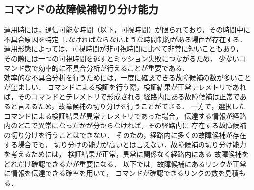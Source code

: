 \documentclass[11pt]{jsreport}
\begin{document}
\subsection{コマンドの故障候補切り分け能力}
運用時には，通信可能な時間（以下，可視時間）が限られており，その時間中に不具合原因を特定
しなければならないような時間制約がある場面が存在する．
運用形態によっては，可視時間が非可視時間に比べて非常に短いこともあり，
その際には一つの可視時間を逃すとミッション失敗につながるため，%
少ないコマンド数で効率的に不具合分析が行えることが重要である．\\
効率的な不具合分析を行うためには，一度に確認できる故障候補の数が多いことが望ましい．
コマンドによる検証を行う際，検証結果が正常テレメトリであれば，そのコマンドとテレメトリで形成される
経路内にある故障候補は正常であると言えるため，故障候補の切り分けを行うことができる．
一方で，選択したコマンドによる検証結果が異常テレメトリであった場合，
伝達する情報が経路内のどこで異常になったかが分からなければ，その経路内に
存在する故障候補の切り分けを行うことはできない．
そのため，経路内に多くの故障候補が存在する場合でも，
切り分けの能力が高いとは言えない．故障候補の切り分け能力を考えるためには，
検証結果が正常，異常に関係なく経路内にある
故障候補をどれだけ確認できるかが重要になる．
以下では，故障候補にあるリンクが正常に情報を伝達できる確率を用いて，
コマンドが確認できるリンクの数を見積もる．
\end{document}
